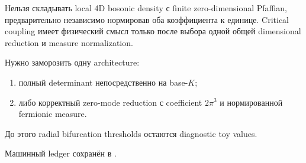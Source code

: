 \begin{nogocriterion}
Нельзя складывать local 4D bosonic density с finite zero-dimensional
Pfaffian, предварительно независимо нормировав оба коэффициента к единице.
Critical coupling имеет физический смысл только после выбора одной общей
dimensional reduction и measure normalization.
\end{nogocriterion}

\begin{protocol}
Нужно заморозить одну architecture:
\begin{enumerate}
\item полный determinant непосредственно на base-$K$;
\item либо корректный zero-mode reduction с coefficient $2\pi^3$ и
нормированной fermionic measure.
\end{enumerate}
До этого radial bifurcation thresholds остаются diagnostic toy values.
\end{protocol}

Машинный ledger сохранён в
.